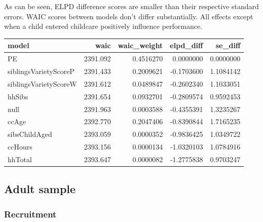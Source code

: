 \documentclass[
  man,floatsintext]{apa6}
\begin{document}
As can be seen, ELPD difference scores are smaller than their respective standard errors. WAIC scores between models don't differ substantially. All effects except when a child entered childcare positively influence performance.

\begin{tabular}{l|r|r|r|r}
\hline
model & waic & waic\_weight & elpd\_diff & se\_diff\\
\hline
PE & 2391.092 & 0.4516270 & 0.0000000 & 0.0000000\\
\hline
siblingsVarietyScoreP & 2391.433 & 0.2009621 & -0.1703600 & 1.1084142\\
\hline
siblingsVarietyScoreW & 2391.612 & 0.0489847 & -0.2602340 & 1.1033051\\
\hline
hhSibs & 2391.654 & 0.0932701 & -0.2809574 & 0.9592453\\
\hline
null & 2391.963 & 0.0003588 & -0.4355391 & 1.3235267\\
\hline
ccAge & 2392.770 & 0.2047406 & -0.8390844 & 1.7165235\\
\hline
sibsChildAged & 2393.059 & 0.0000352 & -0.9836425 & 1.0349722\\
\hline
ccHours & 2393.156 & 0.0000134 & -1.0320103 & 1.0784916\\
\hline
hhTotal & 2393.647 & 0.0000082 & -1.2775838 & 0.9703247\\
\hline
\end{tabular}

\hypertarget{adult-sample}{%
\subsection{Adult sample}\label{adult-sample}}

\hypertarget{recruitment}{%
\subsubsection{Recruitment}\label{recruitment}}
\end{document}
